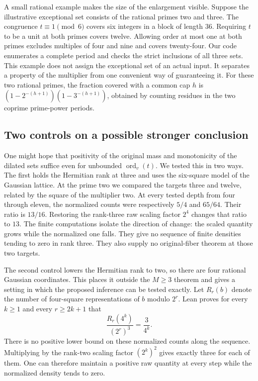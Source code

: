 \documentclass[12pt,letterpaper]{article}
\begin{document}
A small rational example makes the size of the enlargement visible. Suppose the illustrative exceptional set consists of the rational primes two and three. The congruence $t\equiv1\pmod6$ covers six integers in a block of length $36$. Requiring $t$ to be a unit at both primes covers twelve. Allowing order at most one at both primes excludes multiples of four and nine and covers twenty-four. Our code enumerates a complete period and checks the strict inclusions of all three sets. This example does not assign the exceptional set of an actual input. It separates a property of the multiplier from one convenient way of guaranteeing it. For these two rational primes, the fraction covered with a common cap $h$ is $(1-2^{-(h+1)})(1-3^{-(h+1)})$, obtained by counting residues in the two coprime prime-power periods.

\subsection{Two controls on a possible stronger conclusion}
One might hope that positivity of the original mass and monotonicity of the dilated sets suffice even for unbounded $\operatorname{ord}_v(t)$. We tested this in two ways. The first holds the Hermitian rank at three and uses the six-square model of the Gaussian lattice. At the prime two we compared the targets three and twelve, related by the square of the multiplier two. At every tested depth from four through eleven, the normalized counts were respectively $5/4$ and $65/64$. Their ratio is $13/16$. Restoring the rank-three raw scaling factor $2^4$ changes that ratio to $13$. The finite computations isolate the direction of change: the scaled quantity grows while the normalized one falls. They give no sequence of finite densities tending to zero in rank three. They also supply no original-fiber theorem at those two targets.

The second control lowers the Hermitian rank to two, so there are four rational Gaussian coordinates. This places it outside the $M\geq3$ theorem and gives a setting in which the proposed inference can be tested exactly. Let $R_r(b)$ denote the number of four-square representations of $b$ modulo $2^r$. Lean proves for every $k\geq1$ and every $r\geq2k+1$ that
\[
       \frac{R_r(4^k)}{(2^r)^3}=\frac{3}{4^k}.
\]
There is no positive lower bound on these normalized counts along the sequence. Multiplying by the rank-two scaling factor $(2^k)^2$ gives exactly three for each of them. One can therefore maintain a positive raw quantity at every step while the normalized density tends to zero.
\end{document}
